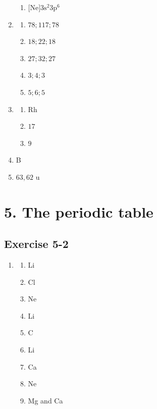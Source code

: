 \begin{multicols}{4}
\begin{enumerate}[noitemsep, label=\textbf{\arabic*}. ]
\begin{enumerate}[noitemsep, label=\textbf{(\alph*)} ]
    \item $\text{[Ne]} 3\text{s}^2 3\text{p}^6$
    \end{enumerate}
\item %
    \begin{enumerate}[noitemsep, label=\textbf{(\alph*)} ]
    \item $78 ; 117 ; 78$
    \item $18 ; 22 ; 18$
    \item $27 ; 32 ; 27$
    \item $3 ; 4 ; 3$
    \item $5 ; 6 ; 5$
    \end{enumerate}
\item %
  \begin{enumerate}[noitemsep, label=\textbf{(\alph*)} ]
  \item Rh
  \item $17$
  \item $9$
  \end{enumerate}
\item %
B
\item %
$63,62 \text{ u}$
\end{enumerate}
\end{multicols}
\section {5. The periodic table}
\subsection{Exercise 5-2} 
\begin{multicols}{5}
\begin{enumerate}[noitemsep, label=\textbf{\arabic*}. ] 
\setcounter{3}
\item %
    \begin{enumerate}[noitemsep, label=\textbf{(\alph*)} ]  
    \item Li
\item Cl
\item Ne
\item Li
\item C
\item Li
\item Ca
\item Ne
\item Mg and Ca
    \end{enumerate}  
\end{enumerate}
\end{multicols}
